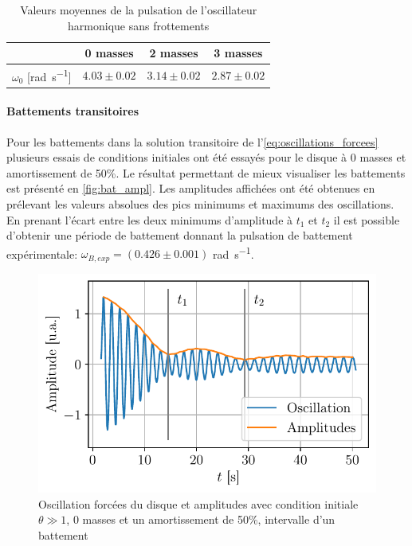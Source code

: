 \begin{table}[h]
    \centering
    \begin{tabulary}{0.9\linewidth}{C C C C}
        \toprule
        & 0 masses & 2 masses & 3 masses \\
        \midrule
        \(\omega_0\) [\si{\radian\per\second}] & \(4.03 \pm 0.02\) & \(3.14 \pm 0.02\) & \(2.87 \pm 0.02\) \\
        \bottomrule
    \end{tabulary}
    \caption{Valeurs moyennes de la pulsation de l'oscillateur harmonique sans frottements}
    \label{tab:omega0_libre}
\end{table}

\paragraph{Battements transitoires}
Pour les battements dans la solution transitoire de l'\autoref{eq:oscillations_forcees} plusieurs essais de conditions initiales ont été essayés pour le disque à 0 masses et amortissement de 50\%. Le résultat permettant de mieux visualiser les battements est présenté en \autoref{fig:bat_ampl}. Les amplitudes affichées ont été obtenues en prélevant les valeurs absolues des pics minimums et maximums des oscillations. En prenant l'écart entre les deux minimums d'amplitude à $t_1$ et $t_2$ il est possible d'obtenir une période de battement donnant la pulsation de battement expérimentale: $\omega_{B,exp} = (0.426 \pm 0.001)
$ \si{\radian\per\second}.
\begin{figure}[h]
    \centering
    \includegraphics[width=0.7\linewidth]{figures/bat_ampl.pdf}
    \caption{Oscillation forcées du disque et amplitudes avec condition initiale $\theta \gg 1$, 0 masses et un amortissement de 50\%, intervalle d'un battement}
    \label{fig:bat_ampl}
\end{figure}

